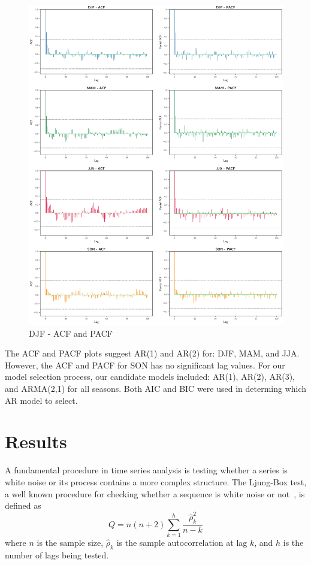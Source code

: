\documentclass[12pt]{article}
\begin{document}
\begin{figure}[H]
  \includegraphics[width=1\textwidth,height=0.75\textheight,center]{figs/acfs}
  \caption{DJF - ACF and PACF}\label{acfs}
\end{figure}

The ACF and PACF plots suggest AR(1) and AR(2) for: DJF, MAM, and JJA. However, the ACF and PACF for SON has no significant lag values. For our model selection process, our candidate models included: AR(1), AR(2), AR(3), and ARMA(2,1) for all seasons. Both AIC and BIC were used in determing which AR model to select. 


\section{Results} \label{sec:results}
A fundamental procedure in time series analysis is testing whether a series is white noise or its process contains a more complex structure. The Ljung-Box test, a well known procedure for checking whether a sequence is white noise or not~\citep{ljung}, is defined as
$$Q = n(n+2)\sum_{k=1}^{h} \frac{\hat{\rho}_{k}^{2}}{n-k}$$
where $n$ is the sample size, $\hat{\rho}_k$ is the sample autocorrelation at lag $k$, and $h$ is the number of lags being tested.
\end{document}
